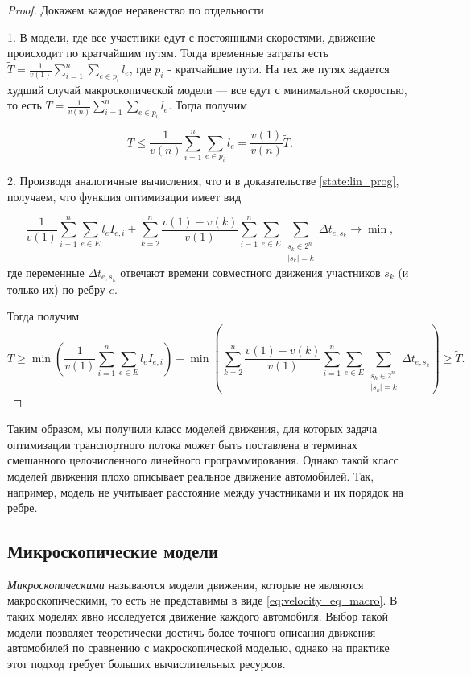 \documentclass[12pt, a4paper]{article}
\DeclareMathOperator*{\minn}{min}
\begin{document}
\begin{proof}
	Докажем каждое неравенство по отдельности
	
	1. В модели, где все участники едут с постоянными скоростями, движение происходит по кратчайшим путям. Тогда временные затраты есть $\widetilde{T} = \frac{1}{v(1)} \sum \limits _{i = 1} ^ n \sum\limits_{e \in p_i} l_e$, где $p_i$ - кратчайшие пути.
	На тех же путях задается худший случай макроскопической модели --- все едут с минимальной скоростью, то есть $ T = \frac{1}{v(n)} \sum \limits _{i = 1} ^ n \sum\limits_{e \in p_i} l_e$. Тогда получим
	
	$$T \le  \frac{1}{v(n)} \sum \limits _{i = 1} ^ n \sum\limits_{e \in p_i} l_e = \frac {v(1)}{v(n)} \widetilde{T}.$$
	
	2. Производя аналогичные вычисления, что и в доказательстве \ref{state:lin_prog}, получаем, что функция оптимизации имеет вид
	
	$$ \frac{1}{v (1)} \sum\limits_{i = 1}^n \sum \limits _{e \in E} l_e I_{e, i} +  \sum\limits_{k = 2}^{n} \frac{v(1) - v(k)}{v (1)}  \sum\limits_{i = 1}^n \sum \limits _{e \in E} \sum\limits _{\substack{ s_k \in 2^n \\ |s_k| = k}}  \Delta t_{e, s_k} \rightarrow \minn ,$$
	где переменные $\Delta t_{e, s_k}$ отвечают времени совместного движения участников $s_k$  (и только их) по ребру $e$.
	
	Тогда получим
		$$T \ge 
		  \minn \left(  \frac{1}{v (1)} \sum\limits_{i = 1}^n \sum \limits _{e \in E} l_e I_{e, i} \right) 
		+ \minn \left(  \sum\limits_{k = 2}^{n} \frac{v(1) - v(k)}{v (1)}  \sum\limits_{i = 1}^n \sum \limits _{e \in E} \sum\limits _{\substack{ s_k \in 2^n \\ |s_k| = k}}  \Delta t_{e, s_k} \right) \ge \widetilde{T}.$$

\end{proof}

Таким образом, мы получили класс моделей движения, для которых задача оптимизации транспортного потока может быть поставлена в терминах смешанного целочисленного линейного программирования. Однако такой класс моделей движения плохо описывает реальное движение автомобилей. Так, например, модель не учитывает расстояние между участниками и их порядок на ребре.

\subsection{Микроскопические модели}
\textit {Микроскопическими} называются модели движения, которые не являются макроскопическими, то есть не представимы в виде \eqref{eq:velocity_eq_macro}. В таких моделях явно исследуется движение каждого автомобиля.
Выбор такой модели позволяет теоретически достичь более точного описания движения автомобилей по сравнению с макроскопической моделью, однако на практике этот подход требует больших вычислительных ресурсов.
\end{document}
